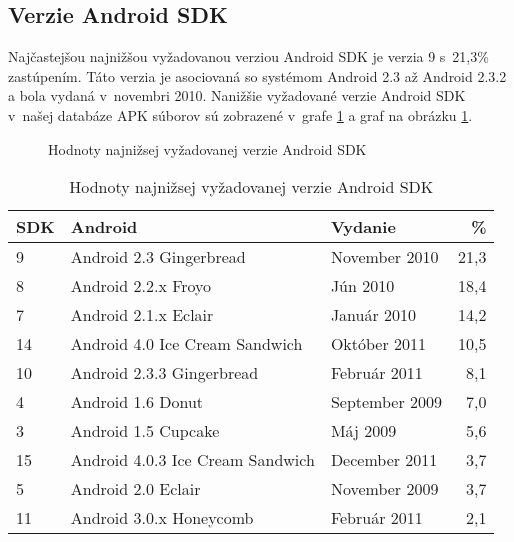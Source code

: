 \subsection*{Verzie Android SDK}

Najčastejšou najnižšou vyžadovanou verziou Android SDK je verzia 9 s~21,3\% zastúpením. Táto verzia je asociovaná so systémom Android 2.3 až Android 2.3.2  a bola vydaná v~novembri 2010. Nanižšie vyžadované verzie Android SDK v~našej databáze APK súborov sú zobrazené v~grafe \ref{tab:minSdk}  a graf na obrázku \ref{minSdkGraf}.
\begin{figure}[htb]
\centering
\begin{bchart}[min=0,max=25,step=5,unit=\%]
\bcskip{3pt}
\bcskip{3pt}
\bcskip{3pt}
\bcskip{3pt}
\bcskip{3pt}
\bcskip{3pt}
\bcskip{3pt}
\bcskip{3pt}
\bcskip{3pt}
\end{bchart}

\caption{Hodnoty najnižsej vyžadovanej verzie Android SDK}
\label{minSdkGraf}
\end{figure}

\begin{table}[htb]
\centering
  \begin{tabular}{|l l l r|}
    \hline
    \textbf{SDK} & \textbf{Android} & \textbf{Vydanie}& \textbf{\%} \\\hline\hline
    9 & Android 2.3 Gingerbread & November 2010 & 21,3 \\
    8 & Android 2.2.x Froyo & Jún 2010& 18,4 \\
    7 & Android 2.1.x Eclair & Január 2010 & 14,2 \\
    14 & Android 4.0 Ice Cream Sandwich & Október 2011 & 10,5 \\
    10 & Android 2.3.3 Gingerbread & Február 2011 & 8,1 \\
    4 & Android 1.6	Donut & September 2009 & 7,0 \\
    3 & Android 1.5	Cupcake & Máj 2009 & 5,6 \\
    15 & Android 4.0.3 Ice Cream Sandwich & December 2011 & 3,7 \\
    5 & Android 2.0 Eclair & November 2009 & 3,7 \\
    11 & Android 3.0.x Honeycomb & Február 2011 & 2,1\\
    \hline
  \end{tabular}
  \caption{Hodnoty najnižsej vyžadovanej verzie Android SDK}
  \label{tab:minSdk}
\end{table}

